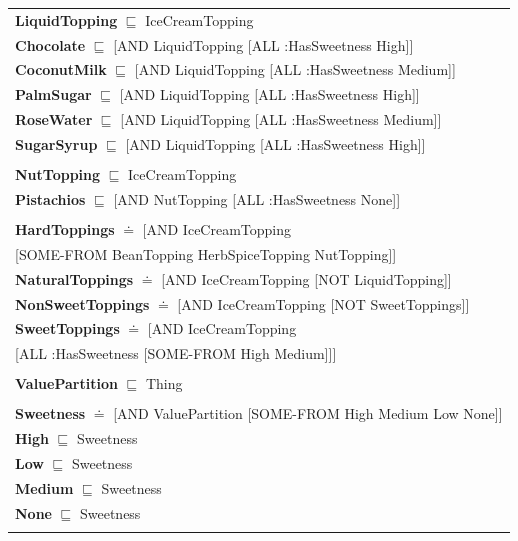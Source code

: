 \documentclass[12pt]{article}
\newcommand*{\MyIndent}{\hspace*{7em}}
\begin{document}
\begin{tabularx}{1\textwidth}{@{}X@{}}
            \textbf{LiquidTopping} $\sqsubseteq$ IceCreamTopping \\            
                \textbf{Chocolate} $\sqsubseteq$ [AND LiquidTopping [ALL :HasSweetness High]] \\
                \textbf{CoconutMilk} $\sqsubseteq$ [AND LiquidTopping [ALL :HasSweetness Medium]] \\
                \textbf{PalmSugar} $\sqsubseteq$ [AND LiquidTopping [ALL :HasSweetness High]] \\
                \textbf{RoseWater} $\sqsubseteq$ [AND LiquidTopping [ALL :HasSweetness Medium]] \\
                \textbf{SugarSyrup} $\sqsubseteq$ [AND LiquidTopping [ALL :HasSweetness High]] \\ \tabularnewline
            
            \textbf{NutTopping} $\sqsubseteq$ IceCreamTopping \\
                \textbf{Pistachios} $\sqsubseteq$ [AND NutTopping [ALL :HasSweetness None]] \\ \tabularnewline
            
            \textbf{HardToppings} $\doteq$ [AND IceCreamTopping \\
                                      \MyIndent [SOME-FROM BeanTopping HerbSpiceTopping NutTopping]] \\
            \textbf{NaturalToppings} $\doteq$ [AND IceCreamTopping [NOT LiquidTopping]] \\
            \textbf{NonSweetToppings} $\doteq$ [AND IceCreamTopping [NOT SweetToppings]] \\
            \textbf{SweetToppings} $\doteq$ [AND IceCreamTopping \\ \MyIndent [ALL :HasSweetness [SOME-FROM High Medium]]] \\\tabularnewline


            \textbf{ValuePartition} $\sqsubseteq$ Thing \\ \tabularnewline
            
            \textbf{Sweetness} $\doteq$ [AND ValuePartition [SOME-FROM High Medium Low None]] \\            
            \textbf{High} $\sqsubseteq$ Sweetness \\
            \textbf{Low} $\sqsubseteq$ Sweetness \\
            \textbf{Medium} $\sqsubseteq$ Sweetness \\
            \textbf{None} $\sqsubseteq$ Sweetness \\
            \tabularnewline

        \bottomrule
        \end{tabularx}
\end{document}

